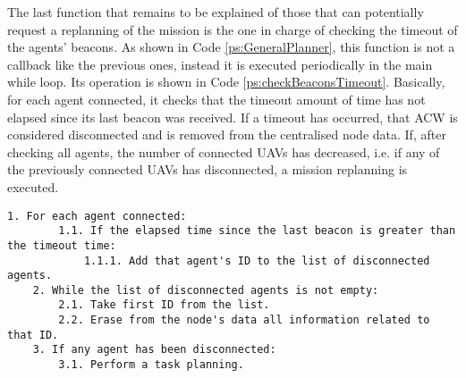 The last function that remains to be explained of those that can potentially request a replanning of the mission is the one in charge of checking the timeout of the agents' beacons. As shown in  Code \ref{ps:GeneralPlanner}, this function is not a callback like the previous ones, instead it is executed periodically in the main while loop. Its operation is shown in Code \ref{ps:checkBeaconsTimeout}. Basically, for each agent connected, it checks that the timeout amount of time has not elapsed since its last beacon was received. If a timeout has occurred, that \gls{ACW} is considered disconnected and is removed from the centralised node data. If, after checking all agents, the number of connected \glspl{UAV} has decreased, i.e. if any of the previously connected \glspl{UAV} has disconnected, a mission replanning is executed.

\begin{lstlisting}[caption={Beacons' timeout check function}, breaklines=true, label=ps:checkBeaconsTimeout]
	1. For each agent connected:
		1.1. If the elapsed time since the last beacon is greater than the timeout time:
			1.1.1. Add that agent's ID to the list of disconnected agents.
	2. While the list of disconnected agents is not empty:
		2.1. Take first ID from the list.
		2.2. Erase from the node's data all information related to that ID.
	3. If any agent has been disconnected:
		3.1. Perform a task planning.
\end{lstlisting}

